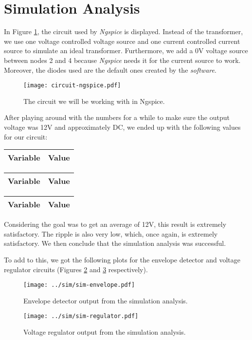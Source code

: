 \clearpage

\section{Simulation Analysis}
\label{sec:simulation}

In Figure \ref{fig:circuit-ngspice}, the circuit used by \textit{Ngspice} is displayed. Instead of the transformer, we use one voltage controlled voltage source and one current controlled current source to simulate an ideal transformer. Furthermore, we add a 0V voltage source between nodes 2 and 4 because \textit{Ngspice} needs it for the current source to work. Moreover, the diodes used are the default ones created by the \textit{software}.

\begin{figure}[h] \centering
\texttt{[image: circuit-ngspice.pdf]}
\caption{The circuit we will be working with in Ngspice.}
\label{fig:circuit-ngspice}
\end{figure}

After playing around with the numbers for a while to make sure the output voltage was 12V and approximately DC, we ended up with the following values for our circuit:

\begin{tabular}{|l|r|}
  \hline    
  {\bf Variable} & {\bf Value} \\ \hline
  
\end{tabular}

\begin{tabular}{|l|r|}
  \hline    
  {\bf Variable} & {\bf Value} \\ \hline
  
\end{tabular}

\begin{tabular}{|l|r|}
  \hline    
  {\bf Variable} & {\bf Value} \\ \hline
  
\end{tabular}

Considering the goal was to get an average of 12V, this result is extremely satisfactory. The ripple is also very low, which, once again, is extremely satisfactory. We then conclude that the simulation analysis was successful.

To add to this, we got the following plots for the envelope detector and voltage regulator circuits (Figures \ref{fig:sim-envelope} and \ref{fig:sim-regulator} respectively).

\begin{figure}[h] \centering
\texttt{[image: ../sim/sim-envelope.pdf]}
\caption{Envelope detector output from the simulation analysis.}
\label{fig:sim-envelope}
\end{figure}

\begin{figure}[h] \centering
\texttt{[image: ../sim/sim-regulator.pdf]}
\caption{Voltage regulator output from the simulation analysis.}
\label{fig:sim-regulator}
\end{figure}